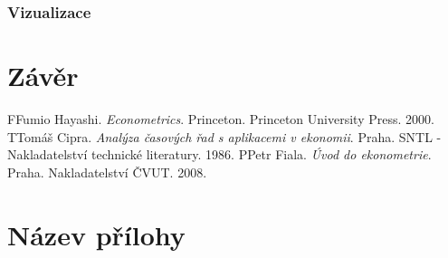 \documentclass[a4paper,12pt,twoside]{scrreprt}
\begin{document}
\subsection{Vizualizace}


\chapter*{Závěr}
%
%


\clearpage
{} %
\begin{thebibliography}{99}   
	\bibitem FFumio Hayashi. \emph{Econometrics}. Princeton. Princeton University Press. 2000.
	\bibitem TTomáš Cipra. \emph{Analýza časových řad s aplikacemi v ekonomii}. Praha. SNTL - Nakladatelství technické literatury. 1986.
	\bibitem PPetr Fiala. \emph{Úvod do ekonometrie}. Praha. Nakladatelství ČVUT. 2008.
\end{thebibliography}

\newpage %
\appendix %

\chapter{Název přílohy} %
%
%
\end{document}
